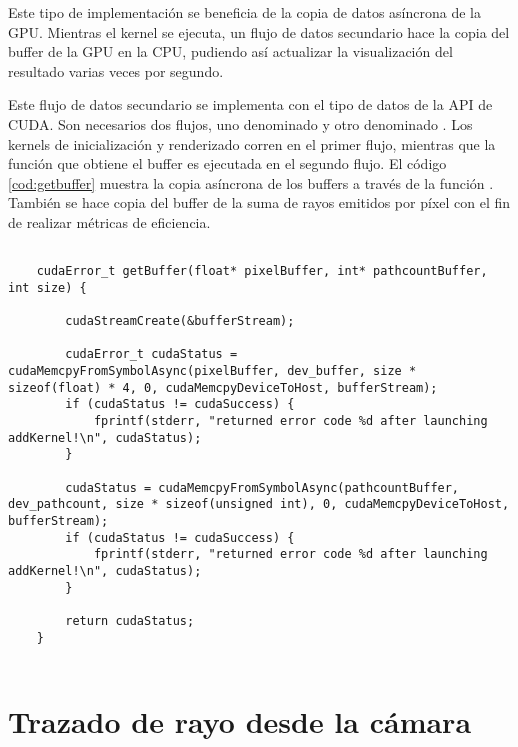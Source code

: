 Este tipo de implementación se beneficia de la copia de datos asíncrona de la GPU. Mientras el kernel se ejecuta, un flujo de datos secundario hace la copia del buffer de la GPU en la CPU, pudiendo así actualizar la visualización del resultado varias veces por segundo.

Este flujo de datos secundario se implementa con el tipo de datos  de la API de CUDA. Son necesarios dos flujos, uno denominado  y otro denominado . Los kernels de inicialización y renderizado corren en el primer flujo, mientras que la función que obtiene el buffer es ejecutada en el segundo flujo. El código \autoref{cod:getbuffer} muestra la copia asíncrona de los buffers a través de la función . También se hace copia del buffer de la suma de rayos emitidos por píxel  con el fin de realizar métricas de eficiencia.


\begin{minipage}[c]{0.95\textwidth}
\begin{lstlisting}[label={cod:getbuffer}, caption={Código para obtener los buffers de la GPU}]
	
	cudaError_t getBuffer(float* pixelBuffer, int* pathcountBuffer, int size) {

		cudaStreamCreate(&bufferStream);

		cudaError_t cudaStatus = cudaMemcpyFromSymbolAsync(pixelBuffer, dev_buffer, size * sizeof(float) * 4, 0, cudaMemcpyDeviceToHost, bufferStream);
		if (cudaStatus != cudaSuccess) {
			fprintf(stderr, "returned error code %d after launching addKernel!\n", cudaStatus);
		}

		cudaStatus = cudaMemcpyFromSymbolAsync(pathcountBuffer, dev_pathcount, size * sizeof(unsigned int), 0, cudaMemcpyDeviceToHost, bufferStream);
		if (cudaStatus != cudaSuccess) {
			fprintf(stderr, "returned error code %d after launching addKernel!\n", cudaStatus);
		}

		return cudaStatus;
	}
	
\end{lstlisting}
\end{minipage}


\section{Trazado de rayo desde la cámara}
\label{sec:calculatecameraray}

